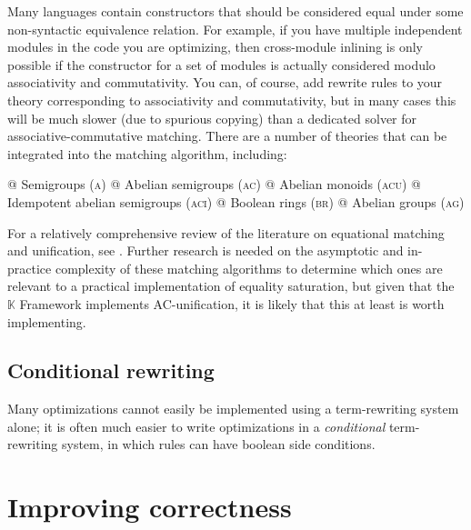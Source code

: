 \documentclass[11pt]{report}
\newcommand{\mbb}[1]{\ensuremath{\mathbb{#1}}}     %
\newlength{\fixmewidth}
\newcommand{\fixme}[1]{%
  \begin{minipage}[c]{\fixmewidth}%
  \todo[color=green!40,inline]{\textsc{fixme:} #1}%
  \end{minipage}}
\newcommand{\sfixme}[0]{%
  \begin{minipage}[c]{3.5em}%
  \todo[color=green!40,inline]{\textsc{fixme}}%
  \end{minipage}}
\begin{document}
Many languages contain constructors that should be considered equal under some
non-syntactic equivalence relation. For example, if you have multiple
independent modules in the code you are optimizing, then cross-module inlining
is only possible if the constructor for a set of modules is actually considered
modulo associativity and commutativity. You can, of course, add rewrite rules
to your theory corresponding to associativity and commutativity, but in many
cases this will be much slower (due to spurious copying) than a dedicated solver
for associative-commutative matching. There are a number of theories that can
be integrated into the matching algorithm, including:

\begin{easylist}[enumerate]
@ Semigroups (\textsc{a})
@ Abelian semigroups (\textsc{ac})
@ Abelian monoids (\textsc{acu})
@ Idempotent abelian semigroups (\textsc{aci})
@ Boolean rings (\textsc{br})
@ Abelian groups (\textsc{ag})
\end{easylist}

For a relatively comprehensive review of the literature on equational matching
and unification, see \cite{siekmann-1989}. Further research is needed on the
asymptotic and in-practice complexity of these matching algorithms to determine
which ones are relevant to a practical implementation of equality saturation,
but given that the $\mbb{K}$ Framework implements AC-unification, it is likely
that this at least is worth implementing.

\section{Conditional rewriting}
\label{sec:conditional-rewriting}

Many optimizations cannot easily be implemented using a term-rewriting system
alone; it is often much easier to write optimizations in a \textit{conditional}
term-rewriting system, in which rules can have boolean side conditions.

\sfixme{}


\chapter{Improving correctness}
\label{sec:improving-correctness}

\fixme{introduction paragraph}
\end{document}

